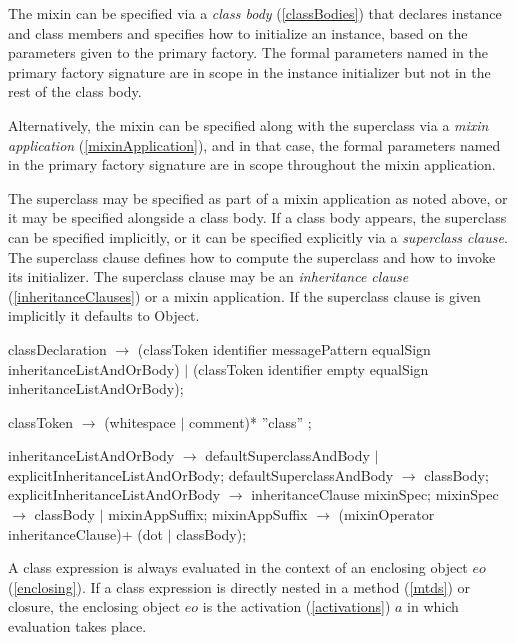 \documentclass{article}
\newcommand{\code}[1]{{\sf #1}}
\begin{document}
The mixin can be specified via a {\em class body} (\ref{classBodies}) that declares instance and
class members and specifies how to initialize an instance, based on
the parameters given to the primary factory.  The formal parameters named in the
primary factory signature are in scope in the instance initializer but not in the rest of the class body. 

Alternatively, the mixin can be
specified along with the superclass via a {\em mixin application} (\ref{mixinApplication}), and in
that case,  the formal parameters named in the
primary factory signature are in scope throughout the mixin application.

The superclass may be specified as part of a mixin application as
noted above, or it may be specified alongside a
class body. If a class body appears, the superclass can be specified
implicitly, or it can be specified explicitly via a {\em superclass clause}.  The superclass clause defines how
to compute the superclass and how to invoke its initializer. The
superclass clause may be an {\em inheritance clause} (\ref{inheritanceClauses}) or a mixin
application. If the superclass clause is given implicitly
it defaults to \code{Object}.  

 \begin{newspeak}
 classDeclaration $\rightarrow$ (classToken identifier messagePattern equalSign
                     inheritanceListAndOrBody) $|$
                  (classToken identifier empty equalSign
                     inheritanceListAndOrBody);

classToken $\rightarrow$ (whitespace $|$ comment)* ''class'' ;

inheritanceListAndOrBody $\rightarrow$ defaultSuperclassAndBody $|$
                                     explicitInheritanceListAndOrBody;
defaultSuperclassAndBody $\rightarrow$ classBody;
explicitInheritanceListAndOrBody $\rightarrow$ inheritanceClause mixinSpec;
mixinSpec $\rightarrow$  classBody $|$ mixinAppSuffix;
mixinAppSuffix $\rightarrow$ (mixinOperator  inheritanceClause)+
                      (dot $|$ classBody);
\end{newspeak}


A class expression is always evaluated in the context of an enclosing object $eo$  (\ref{enclosing}). If a class expression is directly nested in a method (\ref{mtds}) or closure, the enclosing object $eo$ is the activation (\ref{activations}) $a$ in which evaluation takes place.
 
\end{document}
